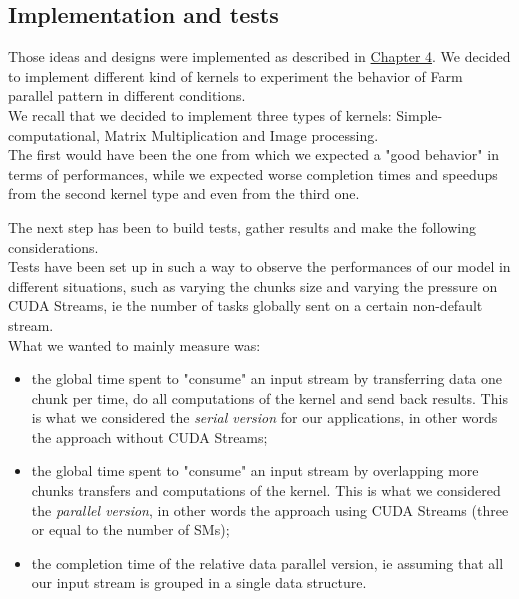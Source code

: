  
 \subsection{Implementation and tests}
 Those ideas and designs were implemented as described in \hyperref[chap:impl]{Chapter 4}. We decided to implement different kind of kernels to experiment the behavior of Farm parallel pattern in different conditions.\\
 We recall that we decided to implement three types of kernels: Simple-computational, Matrix Multiplication and Image processing.\\
 The first would have been the one from which we expected a "good behavior" in terms of performances, while we expected worse completion times and speedups from the second kernel type and even from the third one.
 
 The next step has been to build tests, gather results and make the following considerations.\\
 Tests have been set up in such a way to observe the performances of our model in different situations, such as varying the chunks size and varying the pressure on CUDA Streams, ie the number of tasks globally sent on a certain non-default stream.\\
 What we wanted to mainly measure was:
 \begin{itemize}
 	\item the global time spent to "consume" an input stream by transferring data one chunk per time, do all computations of the kernel and send back results. This is what we considered the \textit{serial version} for our applications, in other words the approach without CUDA Streams;
 	
 	\item the global time spent to "consume" an input stream by overlapping more chunks transfers and computations of the kernel. This is what we considered the \textit{parallel version}, in other words the approach using CUDA Streams (three or equal to the number of SMs);
 	
 	\item the completion time of the relative data parallel version, ie assuming that all our input stream is grouped in a single data structure.
 	
 \end{itemize}
 
